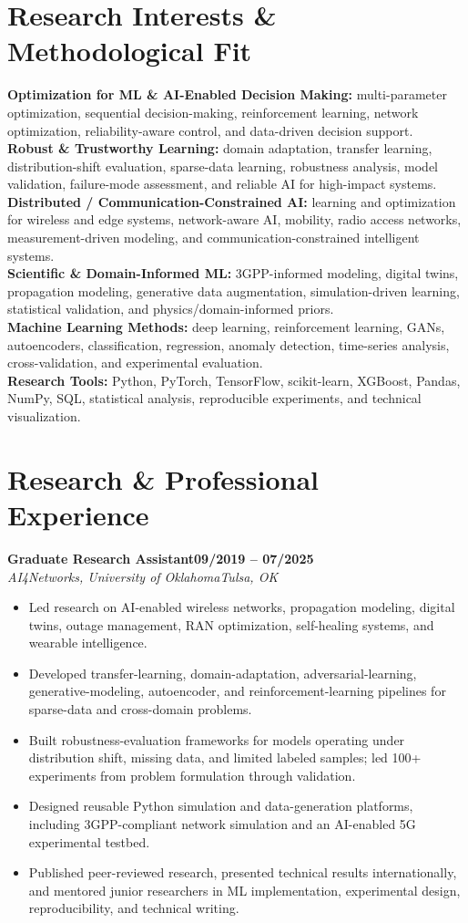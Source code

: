 \documentclass[9pt,letterpaper]{extarticle}
\newcommand{\role}[4]{\Needspace{4\baselineskip}\textbf{#1}\hfill\textbf{#2}\\[-1pt]\textit{#3}\hfill\textit{#4}\par}
\begin{document}
\section{Research Interests \& Methodological Fit}
\textbf{Optimization for ML \& AI-Enabled Decision Making:} multi-parameter optimization, sequential decision-making, reinforcement learning, network optimization, reliability-aware control, and data-driven decision support.\\
\textbf{Robust \& Trustworthy Learning:} domain adaptation, transfer learning, distribution-shift evaluation, sparse-data learning, robustness analysis, model validation, failure-mode assessment, and reliable AI for high-impact systems.\\
\textbf{Distributed / Communication-Constrained AI:} learning and optimization for wireless and edge systems, network-aware AI, mobility, radio access networks, measurement-driven modeling, and communication-constrained intelligent systems.\\
\textbf{Scientific \& Domain-Informed ML:} 3GPP-informed modeling, digital twins, propagation modeling, generative data augmentation, simulation-driven learning, statistical validation, and physics/domain-informed priors.\\
\textbf{Machine Learning Methods:} deep learning, reinforcement learning, GANs, autoencoders, classification, regression, anomaly detection, time-series analysis, cross-validation, and experimental evaluation.\\
\textbf{Research Tools:} Python, PyTorch, TensorFlow, scikit-learn, XGBoost, Pandas, NumPy, SQL, statistical analysis, reproducible experiments, and technical visualization.

\section{Research \& Professional Experience}
\role{Graduate Research Assistant}{09/2019 -- 07/2025}{AI4Networks, University of Oklahoma}{Tulsa, OK}
\begin{itemize}
\item Led research on AI-enabled wireless networks, propagation modeling, digital twins, outage management, RAN optimization, self-healing systems, and wearable intelligence.
\item Developed transfer-learning, domain-adaptation, adversarial-learning, generative-modeling, autoencoder, and reinforcement-learning pipelines for sparse-data and cross-domain problems.
\item Built robustness-evaluation frameworks for models operating under distribution shift, missing data, and limited labeled samples; led 100+ experiments from problem formulation through validation.
\item Designed reusable Python simulation and data-generation platforms, including 3GPP-compliant network simulation and an AI-enabled 5G experimental testbed.
\item Published peer-reviewed research, presented technical results internationally, and mentored junior researchers in ML implementation, experimental design, reproducibility, and technical writing.
\end{itemize}
\end{document}
